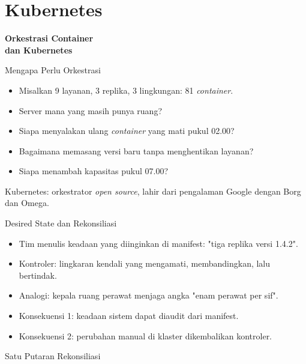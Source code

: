 \documentclass[aspectratio=169, table, 12pt]{beamer}
\begin{document}
\section{Kubernetes}

\begin{frame}{\hfill}
  \centering
  \Huge{\textbf{Orkestrasi Container\\dan Kubernetes}}
\end{frame}

\begin{frame}{{\Large Mengapa Perlu Orkestrasi}}
  \vspace{6pt}
  \begin{itemize}
    \item Misalkan 9 layanan, 3 replika, 3 lingkungan: 81 \textit{container}.
    \item Server mana yang masih punya ruang?
    \item Siapa menyalakan ulang \textit{container} yang mati pukul 02.00?
    \item Bagaimana memasang versi baru tanpa menghentikan layanan?
    \item Siapa menambah kapasitas pukul 07.00?
  \end{itemize}
  \vspace{4pt}
  {\small Kubernetes: orkestrator \textit{open source}, lahir dari pengalaman
  Google dengan Borg dan Omega.}
\end{frame}

\begin{frame}{{\Large Desired State dan Rekonsiliasi}}
  \vspace{6pt}
  \begin{itemize}
    \item Tim menulis keadaan yang diinginkan di manifest: "tiga replika
          versi 1.4.2".
    \item Kontroler: lingkaran kendali yang mengamati, membandingkan, lalu
          bertindak.
    \item Analogi: kepala ruang perawat menjaga angka "enam perawat per sif".
    \item Konsekuensi 1: keadaan sistem dapat diaudit dari manifest.
    \item Konsekuensi 2: perubahan manual di klaster dikembalikan kontroler.
  \end{itemize}
\end{frame}

\begin{frame}{{\Large Satu Putaran Rekonsiliasi}}
  \centering
\end{frame}
\end{document}
